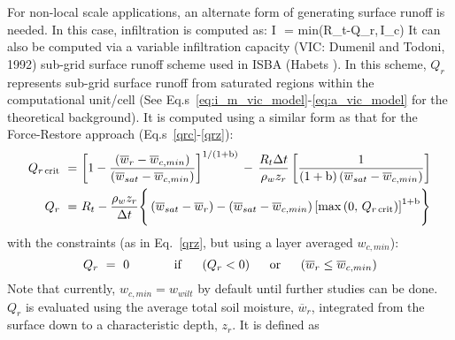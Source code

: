 For non-local scale applications, an alternate form of 
generating surface
runoff is needed. 
In this case, infiltration is computed as:
%
\beq\label{upperwaterbc}
I \,\,=\,\,{\rm min}(R_t-Q_r,\,I_c)
\eeq
%
It can also be computed via a variable infiltration capacity 
(VIC: Dumenil and Todoni, 1992)\nocite{Dumenil1992}
sub-grid surface runoff scheme
used in ISBA (Habets )\nocite{Habets1999}.
%
In this scheme,
$Q_r$ represents sub-grid surface runoff from saturated regions
within the computational unit/cell
(See Eq.s~\ref{eq:i_m_vic_model}-\ref{eq:a_vic_model} for the
theoretical background).
It is computed using a similar form as that for the Force-Restore
approach (Eq.s~\ref{qrc}-\ref{qrz}):
%
\begin{subequations}
\begin{align}
\label{eq:qrc_df}
Q_{r\,{\rm crit}} \,\,=\,\, &
{\left[1 - {\left({\overline w}_r-{\overline w}_{c,min}\right)\over 
\left({\overline w}_{sat}-{\overline w}_{c,min}\right)}\right]}^{1/(1+{\rm b})}
\,-\,
{R_t \Delta t \over \rho_w z_r}
\left[{ 1\over
(1+{\rm b})\left({\overline w}_{sat}-{\overline w}_{c,min}\right)
}\right]
\\
\label{eq:qr_df}
Q_r \,\,=\,\, & R_t - {\rho_w z_r \over\Delta t}
\Biggr\lbrace
\left({\overline w}_{sat}-{\overline w}_r\right)-
\left({\overline w}_{sat}-{\overline w}_{c,min}\right) 
{\left[{\rm max}\left(0,\,Q_{r\,{\rm crit}}\right)\right]}^{1+{\rm b}}
\Biggr\rbrace
\end{align}
\end{subequations}
%
with the constraints (as in Eq.~\ref{qrz}, but using a layer averaged
$w_{c,min}$):
%
\begin{equation}
\label{eq:qrz_df}
Q_r \,\,=\,\, 0
\hskip.5in
{\rm if}\hskip.2in
\left(Q_r < 0 \right) 
\hskip.2in {\rm or}\hskip.2in 
\left({\overline w}_r \leq {\overline w}_{c,min}\right) 
\end{equation}
%
%
Note that currently, $w_{c,min}=w_{wilt}$ by default until further
studies can be done.
$Q_r$ is evaluated using the average total soil moisture, ${\overline w}_r$,
integrated from the surface down
to a characteristic depth, $z_r$. It is defined as
%

